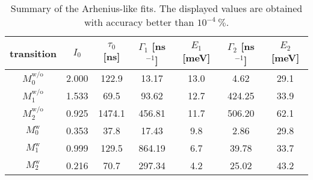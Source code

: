 \begin{table}
	\centering
	\caption{Summary of the Arhenius-like fits. The displayed values are obtained with accuracy better than $10^{-4}~\%$.}
	\begin{tabularx}{0.9\textwidth}{cCCcccc}
		\toprule
		
		
		
		
		
			transition & $I_0$ & $\tau_0$ [ns]& $\Gamma_1$ [ns$^{-1}$]& $E_1$ [meV]& $\Gamma_2$ [ns$^{-1}$]& $E_2$ [meV]\\ 	
			\midrule
			\midrule
			$M_0^\mathrm{w/o}$&  2.000 &  122.9&   13.17&  13.0&  4.62&   29.1 \\
			$M_1^\mathrm{w/o}$& 1.533&   69.5&  93.62&   12.7&   424.25&  33.9\\
			$M_2^\mathrm{w/o}$ &  0.925 &  1474.1 &  456.81 &  11.7&   506.20 &  62.1\\ 
			
			\midrule
			$M_0^\mathrm{w}$& 0.353&   37.8&   17.43&  9.8&   2.86 &  29.8\\
			$M_1^\mathrm{w}$& 0.999 &  129.5 &  864.19&  6.7&   39.78 &  33.7\\
			$M_2^\mathrm{w}$ & 0.216&   70.7&   297.34 &  4.2&   25.02&  43.2\\ 
			

\end{tabularx}
\end{table}
